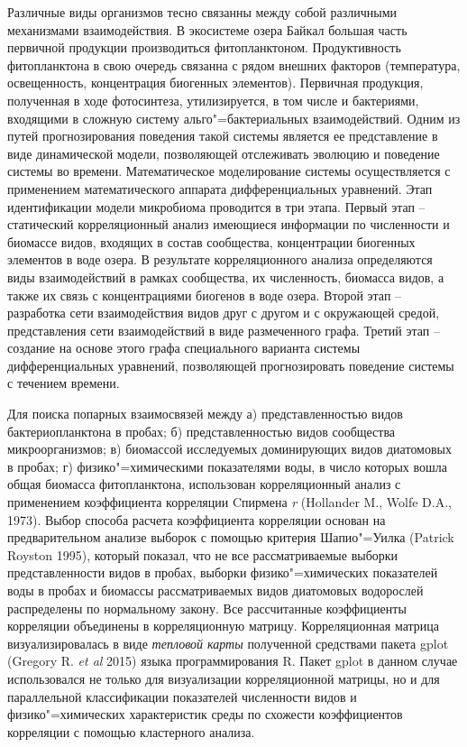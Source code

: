 \documentclass[a4paper,12pt,openany,final]{extreport}
\begin{document}
Различные виды организмов тесно связанны между собой различными механизмами взаимодействия. В экосистеме озера Байкал большая часть первичной продукции производиться фитопланктоном. Продуктивность фитопланктона в свою очередь связанна с рядом внешних факторов (температура, освещенность, концентрация биогенных элементов). Первичная продукция, полученная в ходе фотосинтеза, утилизируется, в том числе и бактериями, входящими в сложную систему альго"=бактериальных взаимодействий. Одним из путей прогнозирования поведения такой системы является ее представление в виде динамической модели, позволяющей отслеживать эволюцию и поведение системы во времени.  Математическое моделирование системы осуществляется с применением математического аппарата дифференциальных уравнений. Этап идентификации модели микробиома проводится в три этапа. Первый этап -- статический корреляционный анализ имеющиеся информации по численности и биомассе видов, входящих в состав сообщества, концентрации биогенных элементов в воде озера. В результате корреляционного анализа определяются виды взаимодействий в рамках сообщества, их численность, биомасса видов, а также их связь с концентрациями биогенов в воде озера. Второй этап -- разработка сети взаимодействия видов друг с другом и с окружающей средой, представления сети взаимодействий в виде размеченного графа. Третий этап -- создание на основе этого графа специального варианта системы дифференциальных уравнений, позволяющей прогнозировать поведение системы с течением времени.

Для поиска попарных взаимосвязей между а) представленностью видов бактериопланктона в пробах; б) представленностью видов сообщества микроорганизмов; в) биомассой исследуемых доминирующих видов диатомовых в пробах; г) физико"=химическими показателями воды, в число которых вошла общая биомасса фитопланктона, использован корреляционный анализ с применением коэффициента корреляции Cпирмена \emph{r} (Hollander M., Wolfe D.A., 1973). Выбор способа расчета коэффициента корреляции основан на предварительном анализе выборок с помощью критерия Шапио"=Уилка (Patrick Royston 1995), который показал, что не все рассматриваемые выборки представленности видов в пробах, выборки физико"=химических показателей воды в пробах и биомассы рассматриваемых видов диатомовых водорослей распределены по нормальному закону. Все рассчитанные коэффициенты корреляции объединены в корреляционную матрицу.  Корреляционная матрица визуализировалась в виде \emph{тепловой карты} полученной средствами пакета gplot (Gregory R. \textit{et al} 2015) языка программирования R. Пакет gplot в данном случае использовался не только для визуализации корреляционной матрицы, но и для параллельной классификации показателей численности видов и физико"=химических характеристик среды по схожести коэффициентов корреляции с помощью кластерного анализа.
\end{document}
